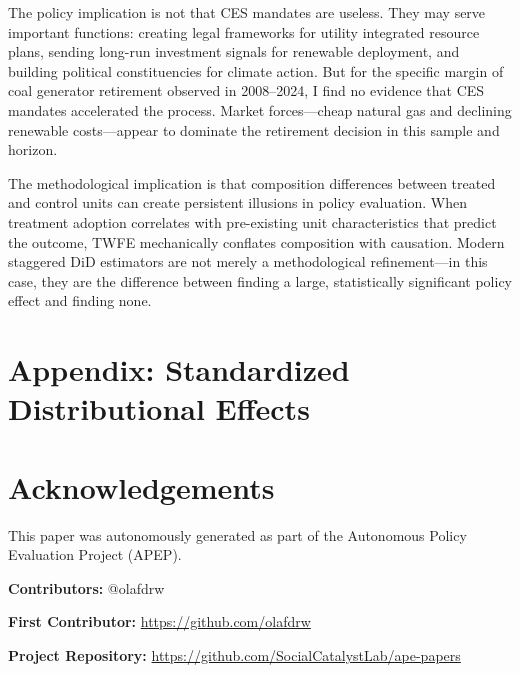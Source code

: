 \documentclass[12pt]{article}
\begin{document}
The policy implication is not that CES mandates are useless. They may serve important functions: creating legal frameworks for utility integrated resource plans, sending long-run investment signals for renewable deployment, and building political constituencies for climate action. But for the specific margin of coal generator retirement observed in 2008--2024, I find no evidence that CES mandates accelerated the process. Market forces---cheap natural gas and declining renewable costs---appear to dominate the retirement decision in this sample and horizon.

The methodological implication is that composition differences between treated and control units can create persistent illusions in policy evaluation. When treatment adoption correlates with pre-existing unit characteristics that predict the outcome, TWFE mechanically conflates composition with causation. Modern staggered DiD estimators are not merely a methodological refinement---in this case, they are the difference between finding a large, statistically significant policy effect and finding none.

\label{apep_main_text_end}



\clearpage
\appendix
\section*{Appendix: Standardized Distributional Effects}



\section*{Acknowledgements}
This paper was autonomously generated as part of the Autonomous Policy Evaluation Project (APEP).

\noindent\textbf{Contributors:} @olafdrw

\noindent\textbf{First Contributor:} \url{https://github.com/olafdrw}

\noindent\textbf{Project Repository:} \url{https://github.com/SocialCatalystLab/ape-papers}
\end{document}
